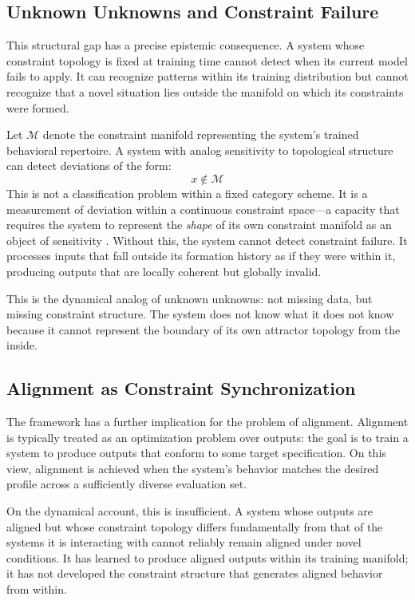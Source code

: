 \documentclass[11pt]{article}
\begin{document}
\subsection{Unknown Unknowns and Constraint Failure}

This structural gap has a precise epistemic consequence. A system whose constraint
topology is fixed at training time cannot detect when its current model fails to apply.
It can recognize patterns within its training distribution but cannot recognize that a
novel situation lies outside the manifold on which its constraints were formed.

Let $\mathcal{M}$ denote the constraint manifold representing the system's trained
behavioral repertoire. A system with analog sensitivity to topological structure can
detect deviations of the form:
\[
x \notin \mathcal{M}
\]
This is not a classification problem within a fixed category scheme. It is a measurement
of deviation within a continuous constraint space---a capacity that requires the system
to represent the \emph{shape} of its own constraint manifold as an object of sensitivity
\citep{friston2013}. Without this, the system cannot detect constraint failure. It
processes inputs that fall outside its formation history as if they were within it,
producing outputs that are locally coherent but globally invalid.

This is the dynamical analog of unknown unknowns: not missing data, but missing constraint
structure. The system does not know what it does not know because it cannot represent the
boundary of its own attractor topology from the inside.

\subsection{Alignment as Constraint Synchronization}

The framework has a further implication for the problem of alignment. Alignment is
typically treated as an optimization problem over outputs: the goal is to train a system
to produce outputs that conform to some target specification. On this view, alignment is
achieved when the system's behavior matches the desired profile across a sufficiently
diverse evaluation set.

On the dynamical account, this is insufficient. A system whose outputs are aligned but
whose constraint topology differs fundamentally from that of the systems it is interacting
with cannot reliably remain aligned under novel conditions. It has learned to produce
aligned outputs within its training manifold; it has not developed the constraint
structure that generates aligned behavior from within.
\end{document}
